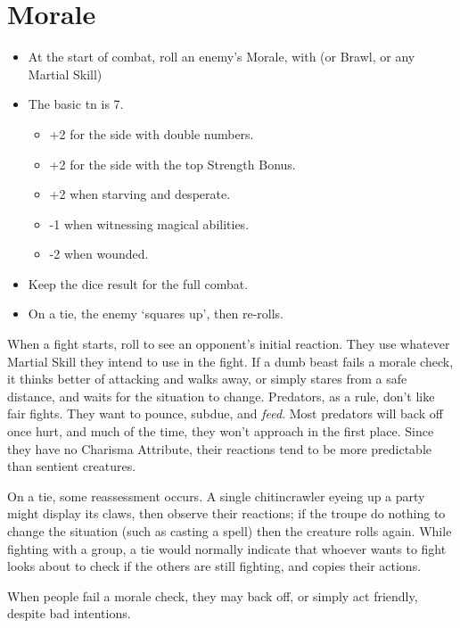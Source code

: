 \section{Morale}
\label{morale}
\begin{multicols}{2}

\begin{itemize}
  \item
  At the start of combat, roll an enemy's Morale, with  (or Brawl, or any Martial Skill)
  \item
  The basic \gls{tn} is 7.
  \begin{itemize}
    \item
    +2 for the side with double numbers.
    \item
    +2 for the side with the top Strength Bonus.
    \item
    +2 when starving and desperate.
    \item
    -1 when witnessing magical abilities.
    \item
    -2 when wounded.
  \end{itemize}
  \item
  Keep the dice result for the full combat.
  \item
  On a tie, the enemy `squares up', then re-rolls.
\end{itemize}

When a fight starts, roll to see an opponent's initial reaction.
They use whatever Martial Skill they intend to use in the fight.
If a dumb beast fails a morale check, it thinks better of attacking and walks away, or simply stares from a safe distance, and waits for the situation to change.
Predators, as a rule, don't like fair fights.
They want to pounce, subdue, and \emph{feed}.
Most predators will back off once hurt, and much of the time, they won't approach in the first place.
Since they have no Charisma Attribute, their reactions tend to be more predictable than sentient creatures.

On a tie, some reassessment occurs.
A single chitincrawler eyeing up a party might display its claws, then observe their reactions; if the troupe do nothing to change the situation (such as casting a spell) then the creature rolls again.
While fighting with a group, a tie would normally indicate that whoever wants to fight looks about to check if the others are still fighting, and copies their actions.

When people fail a morale check, they may back off, or simply act friendly, despite bad intentions.


\end{multicols}
